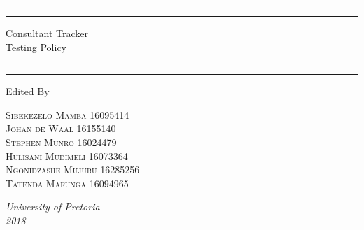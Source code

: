 \documentclass[a4paper, 12pt, oneside]{article}
\begin{document}
\begin{titlepage} %

	\centering %
	
	\scshape %
	
	\vspace*{\baselineskip} %
	
	
	\rule{\textwidth}{1.6pt}\vspace*{-\baselineskip}\vspace*{2pt} %
	\rule{\textwidth}{0.4pt} %
	
	\vspace{0.75\baselineskip} %
	
	{\LARGE Consultant Tracker\\Testing Policy} %
	
	\vspace{0.75\baselineskip} %
	
	\rule{\textwidth}{0.4pt}\vspace*{-\baselineskip}\vspace{3.2pt} %
	\rule{\textwidth}{1.6pt} %
	
	\vspace{2\baselineskip} %
	
	
	
	Edited By
	
	\vspace{0.5\baselineskip} %
	
	{\scshape\Large Sibekezelo Mamba 16095414 \\ Johan de Waal 16155140 \\ Stephen Munro 16024479\\ Hulisani Mudimeli 16073364 \\ Ngonidzashe Mujuru 16285256  \\ Tatenda Mafunga 16094965\\} %
	
	\vspace{0.5\baselineskip} %
	
	\textit{University of Pretoria \\2018} %
	
	\vfill %
	
\end{titlepage}
\end{document}
